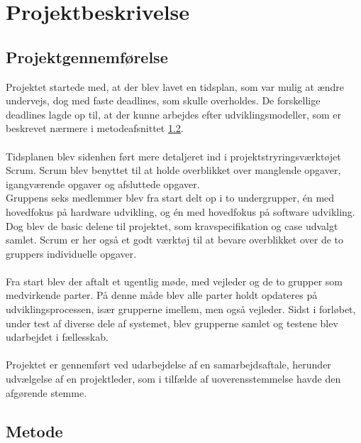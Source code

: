 \chapter{Projektbeskrivelse}

\section{Projektgennemførelse}\label{Projektgennemfoerlse}
Projektet startede med, at der blev lavet en tidsplan, som var mulig at ændre undervejs, dog med faste deadlines, som skulle overholdes. De forskellige deadlines lagde op til, at der kunne arbejdes efter udviklingsmodeller, som er beskrevet nærmere i metodeafsnittet \ref{Metode}.\\ \\
Tidsplanen blev sidenhen ført mere detaljeret ind i projektstryringsværktøjet Scrum. Scrum blev benyttet til at holde overblikket over manglende opgaver, igangværende opgaver og afsluttede opgaver. \\
Gruppens seks medlemmer blev fra start delt op i to undergrupper, én med hovedfokus på hardware udvikling, og én med hovedfokus på software udvikling. Dog blev de basic delene til projektet, som kravspecifikation og case udvalgt samlet. Scrum er her også et godt værktøj til at bevare overblikket over de to gruppers individuelle opgaver.\\ \\
Fra start blev der aftalt et ugentlig møde, med vejleder og de to grupper som medvirkende parter. På denne måde blev alle parter holdt opdateres på udviklingsprocessen, især grupperne imellem, men også vejleder. Sidst i forløbet, under test af diverse dele af systemet, blev grupperne samlet og testene blev udarbejdet i fællesskab.\\ \\
Projektet er gennemført ved udarbejdelse af en samarbejdsaftale, herunder udvælgelse af en projektleder, som i tilfælde af uoverensstemmelse havde den afgørende stemme. 

\section{Metode} \label{Metode}
